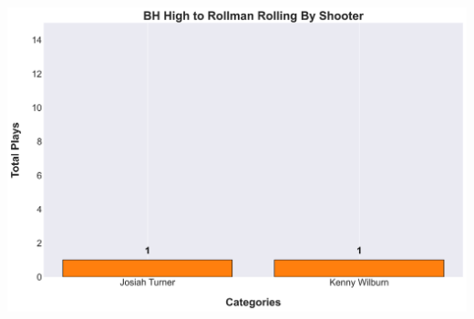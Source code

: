 \documentclass[a4paper,12pt]{article}
\begin{document}
\begin{table}[H]
{\begin{minipage}[t]{0.6\textwidth}
{\begin{tabular}
            \bottomrule
        \end{tabular}
        } %
    \end{minipage}
    } %
    \hfill %
    \begin{minipage}[c]{0.35\textwidth} %
        \flushright
        \includegraphics[width=\textwidth, height=.14\textheight]{images/PNR_PassHighRollsPlayer_Freq.png} %
    \end{minipage}
\end{table}

\vspace{-1em} %
\vspace{-1em} %
\end{document}
